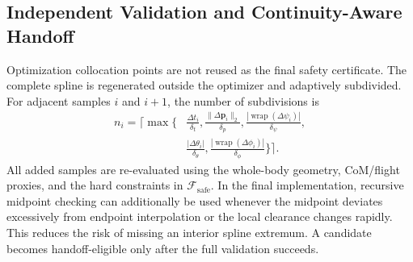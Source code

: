 \documentclass[journal,twoside]{IEEEtran}
\newcommand{\wrap}{\operatorname{wrap}}
\begin{document}
\subsection{Independent Validation and Continuity-Aware Handoff}
Optimization collocation points are not reused as the final safety certificate. The complete spline is regenerated outside the optimizer and adaptively subdivided. For adjacent samples $i$ and $i+1$, the number of subdivisions is
\begin{equation}
\begin{aligned}
n_i=\Bigg\lceil\max\Bigg\{&
 \frac{\Delta t_i}{\delta_t},
 \frac{\|\Delta\mathbf p_i\|_2}{\delta_p},
 \frac{|\wrap(\Delta\psi_i)|}{\delta_\psi},\\[-1mm]
&\frac{|\Delta\theta_i|}{\delta_\theta},
 \frac{|\wrap(\Delta\phi_i)|}{\delta_\phi}
\Bigg\}\Bigg\rceil.
\end{aligned}
\label{eq:dense_validation}
\end{equation}
All added samples are re-evaluated using the whole-body geometry, CoM/flight proxies, and the hard constraints in $\mathcal F_{\mathrm{safe}}$. In the final implementation, recursive midpoint checking can additionally be used whenever the midpoint deviates excessively from endpoint interpolation or the local clearance changes rapidly. This reduces the risk of missing an interior spline extremum. A candidate becomes handoff-eligible only after the full validation succeeds.
\end{document}
